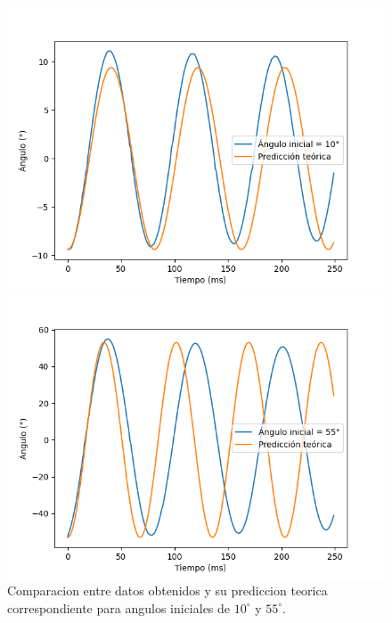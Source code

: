 \documentclass[12pt,a4]{article}
\begin{document}
\begin{figure}[H]
    \centering
    \begin{minipage}{0.5\textwidth}
        \centering
        \includegraphics[width=\textwidth]{peq_osc_10.png}
    \end{minipage}%
    \begin{minipage}{0.5\textwidth}
        \centering
        \includegraphics[width=\textwidth]{peq_osc_55.png}
    \end{minipage}
    \caption{Comparacion entre datos obtenidos y su prediccion teorica correspondiente para angulos iniciales de $10^\circ$ y $55^\circ$.}
    \label{fig:comparacion_angulos}
\end{figure}
\end{document}
